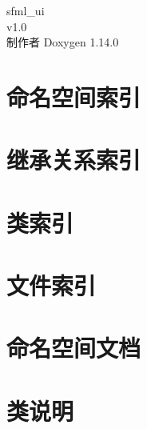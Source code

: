 \documentclass[twoside]{book}
\newcommand{\+}{\discretionary{\mbox{\scriptsize$\hookleftarrow$}}{}{}}
\newcommand{\clearemptydoublepage}{%
    \newpage{\pagestyle{empty}\cleardoublepage}%
  }
\begin{document}
  \raggedbottom
  \begin{CJK}{UTF8}{gbsn}
  \begin{titlepage}
  \vspace*{7cm}
  \begin{center}%
  {\Large sfml\+\_\+ui}\\
  [1ex]\large v1.\+0 \\
  \vspace*{1cm}
  {\large 制作者 Doxygen 1.14.0}\\
  \end{center}
  \end{titlepage}
  \clearemptydoublepage
  \tableofcontents
  \clearemptydoublepage
\chapter{命名空间索引}

\chapter{继承关系索引}

\chapter{类索引}

\chapter{文件索引}

\chapter{命名空间文档}


\chapter{类说明}



























\end{CJK}
\end{document}
